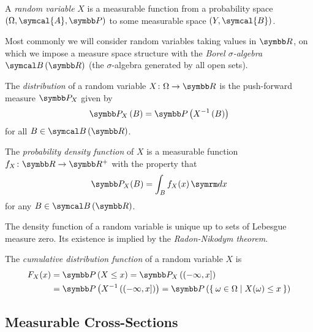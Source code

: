 \begin{definition}
A \emph{random variable} \(X\) is a measurable function from a probability space \(\left(\Omega, \symcal{A}, \probability\right)\) to some measurable space \(\left(Y, \symcal{B}\right)\).
\end{definition}

\begin{remark*}
Most commonly we will consider random variables taking values in \(\reals\), on which we impose a measure space structure with the \emph{Borel \(\sigma\)-algebra} \(\borelsets{\reals}\) (the \(\sigma\)-algebra generated by all open sets).
\end{remark*}

\begin{definition}
The \emph{distribution} of a random variable \(X \colon \Omega \to \reals\) is the push-forward measure \(\probability_X\) given by
\[
    \probability_X \left(B\right) = \probability\left(X^{-1} \left(B\right)\right)
\]
for all \(B \in \borelsets{\reals}\).
\end{definition}

\begin{definition}
The \emph{probability density function} of \(X\) is a measurable function \(f_X \colon \reals \to \reals^{+}\) with the property that
\[
    \probability_X (B) = \int_{B} f_X (x) \diff x
\]
for any \(B \in \borelsets{\reals}\).
\end{definition}

\begin{remark*}
The density function of a random variable is unique up to sets of Lebesgue measure zero. Its existence is implied by the \emph{Radon-Nikodym theorem}.
\end{remark*}

\begin{definition}
The \emph{cumulative distribution function} of a random variable \(X\) is
\begin{align*}
    F_X (x) &= \probability\left(X \leq x\right)
    = \probability_X \left((-\infty, x]\right) \\
    &= \probability\left(X^{-1} \left((-\infty, x]\right)\right)
    = \probability\left(\Set{ \omega \in \Omega | X(\omega) \leq x }\right)
\end{align*}
\end{definition}

\subsection*{Measurable Cross-Sections}

